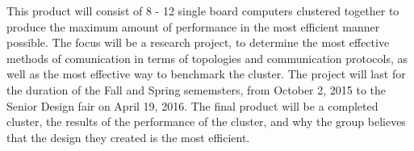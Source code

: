 

\vspace{2\baselineskip}


This product will consist of 8 - 12 single board computers clustered together to produce the maximum amount of performance in the most efficient manner possible. The focus will be a research project, to determine the most effective methods of comunication in terms of topologies and communication protocols, as well as the most effective way to benchmark the cluster. The project will last for the duration of the Fall and Spring sememsters, from October 2, 2015 to the Senior Design fair on April 19, 2016. The final product will be a completed cluster, the results of the performance of the cluster, and why the group believes that the design they created is the most efficient. 

